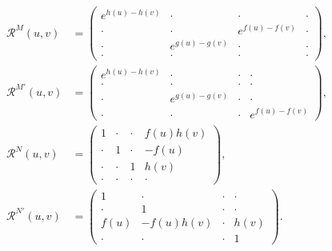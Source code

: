 \documentclass{article}
\begin{document}
\begin{align}
   \mathcal{R}^M(u,v)&=\begin{pmatrix}
       e^{h(u)-h(v)}&\cdot&\cdot&\cdot\\
        \cdot&\cdot&e^{f(u)-f(v)}&\cdot\\
        \cdot&e^{g(u)-g(v)}&\cdot&\cdot\\
        \cdot&\cdot&\cdot&\cdot
    \end{pmatrix},\\
    \mathcal{R}^{M'}(u,v)&=\begin{pmatrix}
       e^{h(u)-h(v)}&\cdot&\cdot&\cdot\\
        \cdot&\cdot&\cdot&\cdot\\
        \cdot&e^{g(u)-g(v)}&\cdot&\cdot\\
        \cdot&\cdot&\cdot&e^{f(u)-f(v)}
    \end{pmatrix},
\\
   \mathcal{R}^N(u,v)&=\begin{pmatrix}
        1&\cdot&\cdot&f(u)h(v)\\
        \cdot&1&\cdot&-f(u)\\
       \cdot&\cdot&1&h(v)\\
        \cdot&\cdot&\cdot&\cdot
    \end{pmatrix},\\
  \mathcal{R}^{N'}(u,v)& =\begin{pmatrix}
        1&\cdot&\cdot&\cdot\\
        \cdot&1&\cdot&\cdot\\
        f(u)&-f(u)h(v)&\cdot&h(v)\\
        \cdot&\cdot&\cdot&1
    \end{pmatrix}.
    \end{align}
\end{document}

